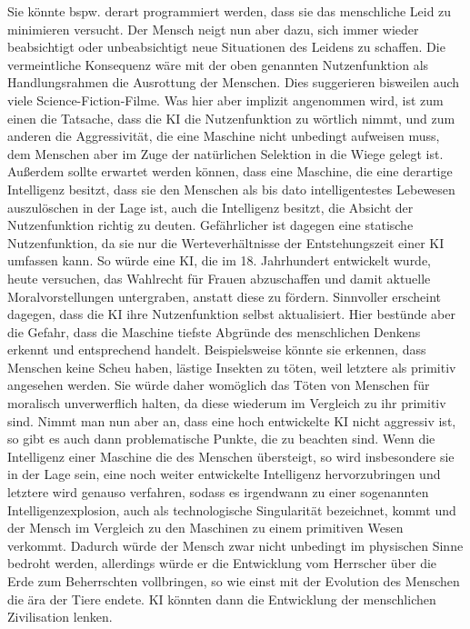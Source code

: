 Sie könnte bspw.
derart programmiert werden, dass sie das menschliche Leid zu minimieren versucht.
Der Mensch neigt nun aber dazu, sich immer wieder beabsichtigt oder unbeabsichtigt neue Situationen des Leidens zu schaffen.
Die vermeintliche Konsequenz
wäre mit der oben genannten Nutzenfunktion als Handlungsrahmen die Ausrottung der
Menschen.
Dies suggerieren bisweilen auch viele Science-Fiction-Filme.
Was hier aber implizit angenommen wird, ist zum einen die Tatsache, dass die KI die Nutzenfunktion zu wörtlich nimmt, und zum anderen die Aggressivität, die eine Maschine nicht unbedingt aufweisen muss, dem Menschen aber im Zuge der natürlichen Selektion in die Wiege gelegt ist.
Außerdem sollte erwartet werden können, dass eine Maschine, die eine derartige Intelligenz besitzt, dass sie den Menschen als bis dato intelligentestes Lebewesen auszulöschen in der Lage ist, auch die Intelligenz besitzt, die Absicht der Nutzenfunktion richtig zu deuten.
Gefährlicher ist dagegen eine statische Nutzenfunktion, da sie nur die Werteverhältnisse der Entstehungszeit einer KI umfassen kann.
So würde eine KI, die im 18.
Jahrhundert entwickelt wurde, heute versuchen, das Wahlrecht für Frauen abzuschaffen und damit aktuelle Moralvorstellungen untergraben, anstatt diese zu fördern.
Sinnvoller erscheint dagegen, dass die KI ihre Nutzenfunktion selbst aktualisiert.
Hier bestünde aber die Gefahr, dass die Maschine tiefste Abgründe des menschlichen Denkens erkennt und entsprechend handelt.
Beispielsweise könnte sie erkennen, dass Menschen keine Scheu haben, lästige Insekten zu töten, weil letztere als primitiv angesehen werden.
Sie würde daher womöglich das Töten von Menschen für moralisch unverwerflich halten, da diese wiederum im Vergleich zu ihr primitiv sind.
Nimmt man nun aber an, dass eine hoch entwickelte KI nicht aggressiv ist, so gibt es auch dann problematische Punkte, die zu beachten sind.
Wenn die Intelligenz einer Maschine die des Menschen übersteigt, so wird insbesondere sie in der Lage sein, eine noch weiter entwickelte Intelligenz hervorzubringen und letztere wird genauso verfahren, sodass es irgendwann zu einer sogenannten Intelligenzexplosion, auch als technologische Singularität bezeichnet, kommt und der Mensch im Vergleich zu den Maschinen zu einem primitiven Wesen verkommt.
Dadurch würde der Mensch zwar nicht unbedingt im physischen Sinne bedroht werden, allerdings würde er die Entwicklung vom Herrscher über die Erde zum Beherrschten vollbringen, so wie einst mit der Evolution des Menschen die ära der Tiere endete.
KI könnten dann die Entwicklung der menschlichen Zivilisation lenken.
